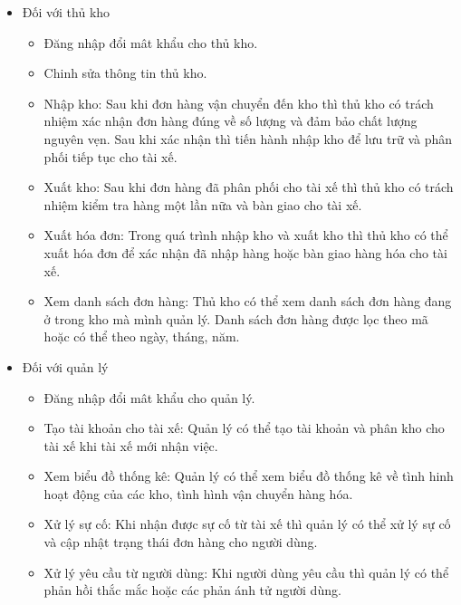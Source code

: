 \begin{itemize}
	                
				\item Đối với thủ kho
			    	\begin{itemize}
			    	    \item Đăng nhập đổi mât khẩu cho thủ kho.
			    	    \item Chinh sửa thông tin thủ kho.
	                    \item Nhập kho: Sau khi đơn hàng vận chuyển đến kho thì thủ kho có trách nhiệm xác nhận đơn hàng đúng về số lượng và đảm bảo chất lượng nguyên vẹn. Sau khi xác nhận thì tiến hành nhập kho để lưu trữ và phân phối tiếp tục cho tài xế.
	                    \item Xuất kho: Sau khi đơn hàng đã phân phối cho tài xế thì thủ kho có trách nhiệm kiểm tra hàng một lần nữa và bàn giao cho tài xế. 
	                    \item Xuất hóa đơn: Trong quá trình nhập kho và xuất kho thì thủ kho có thể xuất hóa đơn để xác nhận đã nhập hàng hoặc bàn giao hàng hóa cho tài xế.
	                    \item Xem danh sách đơn hàng: Thủ kho có thể xem danh sách đơn hàng đang ở trong kho mà mình quản lý. Danh sách đơn hàng được lọc theo mã hoặc có thể theo ngày, tháng, năm.
	                \end{itemize}
	                
	                
				\item Đối với quản lý
				    \begin{itemize}
	                    \item Đăng nhập đổi mât khẩu cho quản lý.
	                    \item Tạo tài khoản cho tài xế: Quản lý có thể tạo tài khoản và phân kho cho tài xế khi tài xế mới nhận việc.
	                    \item Xem biểu đồ thống kê: Quản lý có thể xem biểu đồ thống kê về tình hinh hoạt động của các kho, tình hình vận chuyển hàng hóa.
	                    \item Xử lý sự cố: Khi nhận được sự cố từ tài xế thì quản lý có thể xử lý sự cố và cập nhật trạng thái đơn hàng cho người dùng.
	                    \item Xử lý yêu cầu từ người dùng: Khi người dùng yêu cầu thì quản lý có thể phản hồi thắc mắc hoặc các phản ánh tử người dùng.
	                \end{itemize}
		\end{itemize}
    
